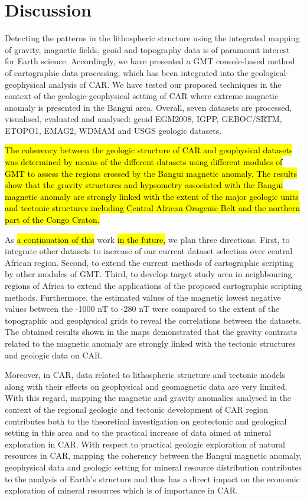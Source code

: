 \documentclass[minerals,article,submit,pdftex,moreauthors]{Definitions/mdpi}
\begin{document}
\section{Discussion}
Detecting the patterns in the lithospheric structure using the integrated mapping of gravity, magnetic fields, geoid and topography data is of paramount interest for Earth science. Accordingly, we have presented a GMT console-based method of cartographic data processing, which has been integrated into the geological-geophysical analysis of CAR. We have tested our proposed techniques in the context of the geologic-geophysical setting of CAR where extreme magnetic anomaly is presented in the Bangui area. Overall, seven datasets are processed, visualised, evaluated and analysed: geoid EGM2008, IGPP, GEBOC/SRTM, ETOPO1, EMAG2, WDMAM and USGS geologic datasets. 

\hl{The coherency between the geologic structure of CAR and geophysical datasets was determined by means of the different datasets using different modules of GMT to assess the regions crossed by the Bangui magnetic anomaly. The results show that the gravity structures and hypsometry associated with the Bangui magnetic anomaly are strongly linked with the extent of the major geologic units and tectonic structures including Central African Orogenic Belt and the northern part of the Congo Craton. }

As \hl{a continuation of this }work \hl{in the future, }we plan three directions. First, to integrate other datasets to increase of our current dataset selection over central African region. Second, to extend the current methods of cartographic scripting by other modules of GMT. Third, to develop target study area in neighbouring regions of Africa to extend the applications of the proposed cartographic scripting methods. Furthermore, the estimated values of the magnetic lowest negative values between the -1000 nT to -280 nT  were compared to the extent of the topographic and geophysical grids to reveal the correlations between the datasets. The obtained results shown in the maps demonstrated that the gravity contrasts related to the magnetic anomaly are strongly linked with the tectonic structures and geologic data on CAR. 

Moreover, in CAR, data related to lithospheric structure and tectonic models along with their effects on geophysical and geomagnetic data are very limited. With this regard, mapping the magnetic and gravity anomalies analysed in the context of the regional geologic and tectonic development of CAR region contributes both to the theoretical investigation on geotectonic and geological setting in this area and to the practical increase of data aimed at mineral exploration in CAR. With respect to practical geologic exploration of natural resources in CAR, mapping the coherency between the Bangui magnetic anomaly, geophysical data and geologic setting for mineral resource distribution contributes to the analysis of Earth's structure and thus has a direct impact on the economic exploration of mineral resources which is of importance in CAR.
\end{document}
